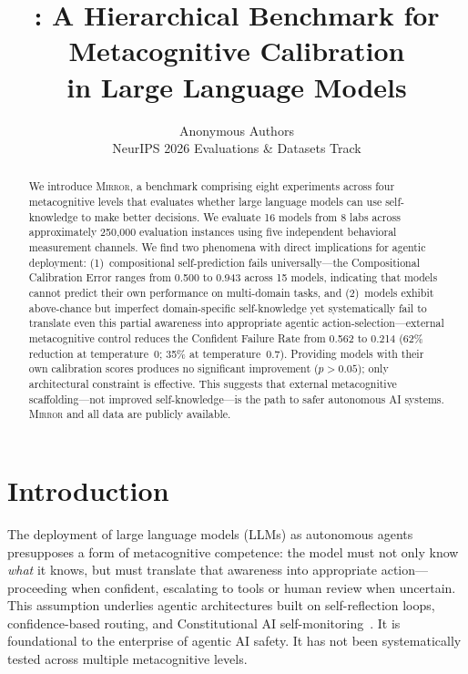 \documentclass[10pt]{article}
\title{\mirror{}: A Hierarchical Benchmark for Metacognitive Calibration\\in Large Language Models}
\author{
  Anonymous Authors \\
  NeurIPS 2026 Evaluations \& Datasets Track
}
\date{}
\newcommand{\mirror}{\textsc{Mirror}}
\begin{document}
\maketitle

\begin{abstract}
We introduce \mirror{}, a benchmark comprising eight experiments across four
metacognitive levels that evaluates whether large language models can use
self-knowledge to make better decisions. We evaluate 16 models from 8 labs across
approximately 250,000 evaluation instances using five independent behavioral
measurement channels. We find two phenomena with direct implications for agentic
deployment: (1)~compositional self-prediction fails universally---the Compositional
Calibration Error ranges from 0.500 to 0.943 across 15 models, indicating that
models cannot predict their own performance on multi-domain tasks, and (2)~models
exhibit above-chance but imperfect domain-specific self-knowledge yet systematically
fail to translate even this partial awareness into appropriate agentic
action-selection---external metacognitive control reduces the Confident Failure Rate
from 0.562 to 0.214 (62\% reduction at temperature~0; 35\% at temperature~0.7).
Providing models with their own calibration scores produces no significant
improvement ($p > 0.05$); only architectural constraint is effective. This suggests
that external metacognitive scaffolding---not improved self-knowledge---is the path
to safer autonomous AI systems. \mirror{} and all data are publicly available.
\end{abstract}

\section{Introduction}
\label{sec:intro}

The deployment of large language models (LLMs) as autonomous agents presupposes a
form of metacognitive competence: the model must not only know \textit{what} it
knows, but must translate that awareness into appropriate action---proceeding when
confident, escalating to tools or human review when uncertain. This assumption
underlies agentic architectures built on self-reflection loops, confidence-based
routing, and Constitutional AI self-monitoring~\citep{perez2022sycophancy}. It is
foundational to the enterprise of agentic AI safety. It has not been
systematically tested across multiple metacognitive levels.
\end{document}
